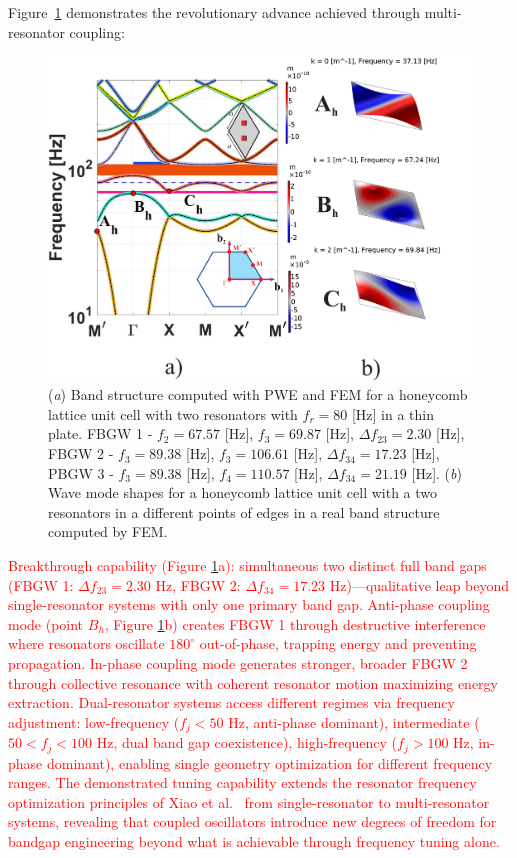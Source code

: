 \documentclass[review,numbers,sort&compress]{elsarticle}
\begin{document}
Figure~\ref{pwe_fem_disp_modal_hex} demonstrates the revolutionary advance achieved through multi-resonator coupling:
\newpage
\begin{figure}[htb]
	\centering
	\includegraphics[width=1\textwidth]{1_4_disp_frf_hex.pdf}
	\caption{(\textit{a}) Band structure computed with PWE and FEM for a honeycomb lattice unit cell with two resonators with $f_r = 80$ [Hz] in a thin plate. FBGW 1 - $f_2 = 67.57$ [Hz], $f_3 = 69.87$ [Hz], $\Delta f_{23} = 2.30 $ [Hz], FBGW 2 - $f_3 = 89.38$ [Hz], $f_3 = 106.61$ [Hz], $\Delta f_{34} = 17.23 $ [Hz], PBGW 3 - $f_3 = 89.38$ [Hz], $f_4 = 110.57$ [Hz], $\Delta f_{34} = 21.19 $ [Hz]. (\textit{b}) Wave mode shapes for a honeycomb lattice unit cell with a two resonators in a different points of edges in a real band structure computed by FEM.}
	\label{pwe_fem_disp_modal_hex}
\end{figure}

\textcolor{red}{Breakthrough capability (Figure \ref{pwe_fem_disp_modal_hex}a): simultaneous two distinct full band gaps (FBGW 1: $\Delta f_{23} = 2.30$ Hz, FBGW 2: $\Delta f_{34} = 17.23$ Hz)---qualitative leap beyond single-resonator systems with only one primary band gap. Anti-phase coupling mode (point $B_h$, Figure \ref{pwe_fem_disp_modal_hex}b) creates FBGW 1 through destructive interference where resonators oscillate $180^\circ$ out-of-phase, trapping energy and preventing propagation. In-phase coupling mode generates stronger, broader FBGW 2 through collective resonance with coherent resonator motion maximizing energy extraction. Dual-resonator systems access different regimes via frequency adjustment: low-frequency ($f_j < 50$ Hz, anti-phase dominant), intermediate ($50 < f_j < 100$ Hz, dual band gap coexistence), high-frequency ($f_j > 100$ Hz, in-phase dominant), enabling single geometry optimization for different frequency ranges.} \textcolor{red}{The demonstrated tuning capability extends the resonator frequency optimization principles of Xiao et al.~\cite{Xiao_2012} from single-resonator to multi-resonator systems, revealing that coupled oscillators introduce new degrees of freedom for bandgap engineering beyond what is achievable through frequency tuning alone.}
\end{document}
